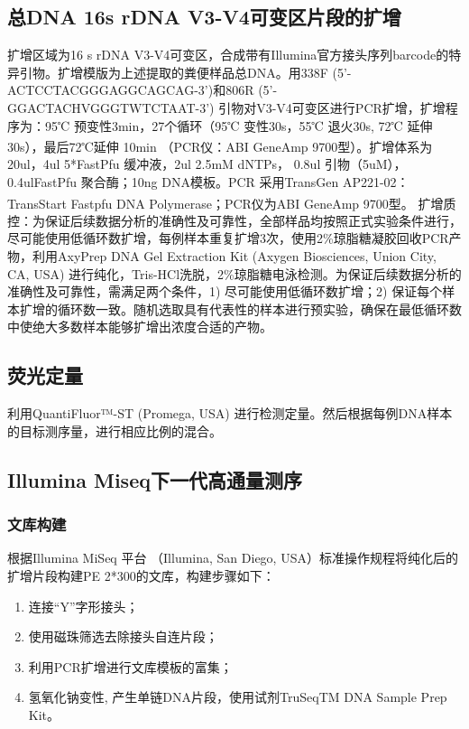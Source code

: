   \subsection{总DNA 16s rDNA V3-V4可变区片段的扩增}
  \label{总DNA 16s rDNA V3-V4可变区片段的扩增}
  扩增区域为16 s rDNA V3-V4可变区，合成带有Illumina官方接头序列barcode的特异引物。扩增模版为上述提取的粪便样品总DNA。用338F (5’-ACTCCTACGGGAGGCAGCAG-3’)和806R (5’-GGACTACHVGGGTWTCTAAT-3’) 引物对V3-V4可变区进行PCR扩增，扩增程序为：95℃ 预变性3min，27个循环（95℃ 变性30s，55℃ 退火30s, 72℃ 延伸30s），最后72℃延伸 10min （PCR仪：ABI GeneAmp\textsuperscript{\textregistered} 9700型）。扩增体系为20ul，4ul 5*FastPfu 缓冲液，2ul 2.5mM dNTPs， 0.8ul 引物（5uM）， 0.4ulFastPfu 聚合酶；10ng DNA模板。PCR 采用TransGen AP221-02：TransStart Fastpfu DNA Polymerase；PCR仪为ABI GeneAmp\textsuperscript{\textregistered} 9700型。
  扩增质控：为保证后续数据分析的准确性及可靠性，全部样品均按照正式实验条件进行，尽可能使用低循环数扩增，每例样本重复扩增3次，使用2\%琼脂糖凝胶回收PCR产物，利用AxyPrep DNA Gel Extraction Kit (Axygen Biosciences, Union City, CA, USA) 进行纯化，Tris-HCl洗脱，2\%琼脂糖电泳检测。为保证后续数据分析的准确性及可靠性，需满足两个条件，1) 尽可能使用低循环数扩增；2) 保证每个样本扩增的循环数一致。随机选取具有代表性的样本进行预实验，确保在最低循环数中使绝大多数样本能够扩增出浓度合适的产物。
  \subsection{荧光定量}
  \label{荧光定量}
  利用QuantiFluor™-ST (Promega, USA) 进行检测定量。然后根据每例DNA样本的目标测序量，进行相应比例的混合。
  \subsection{Illumina Miseq下一代高通量测序}
  \label{Illumina Miseq下一代高通量测序}
      \subsubsection{文库构建}
      根据Illumina MiSeq 平台 （Illumina, San Diego, USA）标准操作规程将纯化后的扩增片段构建PE 2*300的文库，构建步骤如下：
        \begin{enumerate}
          \item 连接“Y”字形接头；
          \item 使用磁珠筛选去除接头自连片段；
          \item 利用PCR扩增进行文库模板的富集；
          \item 氢氧化钠变性, 产生单链DNA片段，使用试剂TruSeqTM DNA Sample Prep Kit。
        \end{enumerate}
